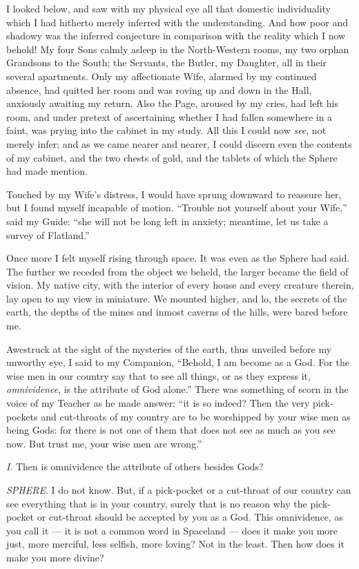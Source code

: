 \documentclass[10pt, kindle, oneside]{kindle}
\begin{document}
I looked below, and saw with my physical eye all that domestic individuality
which I had hitherto merely inferred with the understanding. And how poor and
shadowy was the inferred conjecture in comparison with the reality which I now
behold! My four Sons calmly asleep in the North-Western rooms, my two orphan
Grandsons to the South; the Servants, the Butler, my Daughter, all in their
several apartments. Only my affectionate Wife, alarmed by my continued
absence, had quitted her room and was roving up and down in the Hall,
anxiously awaiting my return. Also the Page, aroused by my cries, had left his
room, and under pretext of ascertaining whether I had fallen somewhere in a
faint, was prying into the cabinet in my study. All this I could now \emph{see}, not
merely infer; and as we came nearer and nearer, I could discern even the
contents of my cabinet, and the two chests of gold, and the tablets of which
the Sphere had made mention.

Touched by my Wife's distress, I would have sprung downward to reassure her,
but I found myself incapable of motion. ``Trouble not yourself about your
Wife,'' said my Guide: ``she will not be long left in anxiety; meantime, let us
take a survey of Flatland.''

Once more I felt myself rising through space. It was even as the Sphere had
said. The further we receded from the object we beheld, the larger became the
field of vision. My native city, with the interior of every house and every
creature therein, lay open to my view in miniature. We mounted higher, and lo,
the secrets of the earth, the depths of the mines and inmost caverns of the
hills, were bared before me.

Awestruck at the sight of the mysteries of the earth, thus unveiled before my
unworthy eye, I said to my Companion, ``Behold, I am become as a God. For the
wise men in our country say that to see all things, or as they express it,
\emph{omnividence}, is the attribute of God alone.'' There was something of scorn in
the voice of my Teacher as he made answer: ``it is so indeed? Then the very
pick-pockets and cut-throats of my country are to be worshipped by your wise
men as being Gods: for there is not one of them that does not see as much as
you see now. But trust me, your wise men are wrong.''

\emph{I}. Then is omnividence the attribute of
others besides Gods?

\emph{SPHERE}. I do not know. But, if a pick-pocket or a cut-throat of our country
can see everything that is in your country, surely that is no reason why the
pick-pocket or cut-throat should be accepted by you as a God. This
omnividence, as you call it --- it is not a common word in Spaceland --- does it
make you more just, more merciful, less selfish, more loving? Not in the
least. Then how does it make you more divine?
\end{document}
